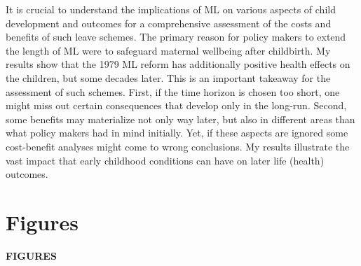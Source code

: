 \documentclass[11pt, a4paper,draft]{article} %
\begin{document}
It is crucial to understand the implications of ML on various aspects of child development and outcomes for a comprehensive assessment of the costs and benefits of such leave schemes. The primary reason for policy makers to extend the length of ML were to safeguard maternal wellbeing after childbirth. My results show that the 1979 ML reform has additionally positive health effects on the children, but some decades later. This is an important takeaway for the assessment of such schemes. First, if the time horizon is chosen too short, one might miss out certain consequences that develop only in the long-run. Second, some benefits may materialize not only way later, but also in different areas than what policy makers had in mind initially. Yet, if these aspects are ignored some cost-benefit analyses might come to wrong conclusions. My results illustrate the vast impact that early childhood conditions can have on later life (health) outcomes. 


 
 

 
 

 





\newpage






\newpage
\TODO\section{Figures}
\vspace*{\fill}
{\Huge \begin{center}\textbf{FIGURES}\end{center}}
\vspace*{\fill}\clearpage
\end{document}
